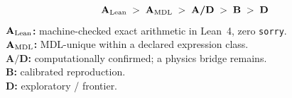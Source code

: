 \documentclass[11pt]{article}
\theoremstyle{remark}
\newcommand{\CatAL}{\ensuremath{\textbf{A}_{\rm Lean}}}
\newcommand{\CatAMDL}{\ensuremath{\textbf{A}_{\rm MDL}}}
\newcommand{\CatAD}{\textbf{A/D}}
\newcommand{\CatB}{\textbf{B}}
\newcommand{\CatD}{\textbf{D}}
\begin{document}
\tableofcontents

\begin{tcolorbox}[colback=gray!4,colframe=gray!50!black,
  title={\textbf{Claim-strength taxonomy}},
  fonttitle=\bfseries,left=6pt,right=6pt,top=5pt,bottom=5pt]
\small
\[
\CatAL \;>\; \CatAMDL \;>\; \CatAD \;>\; \CatB \;>\; \CatD
\]
\textbf{$\CatAL$:} machine-checked exact arithmetic in Lean~4, zero \texttt{sorry}.\\
\textbf{$\CatAMDL$:} MDL-unique within a declared expression class.\\
\textbf{$\CatAD$:} computationally confirmed; a physics bridge remains.\\
\textbf{$\CatB$:} calibrated reproduction.\\
\textbf{$\CatD$:} exploratory / frontier.
\end{tcolorbox}
\end{document}
